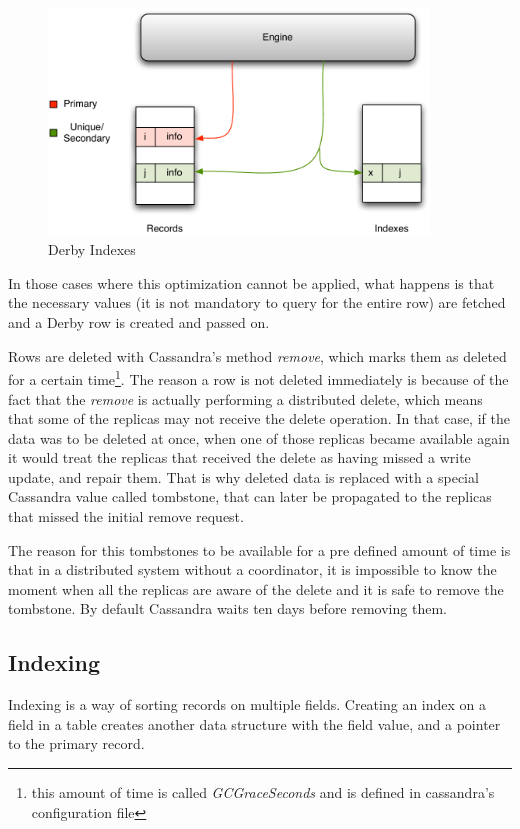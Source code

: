 \begin{figure}[!h]
  \centering    
  \includegraphics[width=0.9\textwidth]{images/derbyindexes}
  \caption{Derby Indexes}
  \label{fig:derbyindexes}
\end{figure}

In those cases where this optimization cannot be applied, what happens is that the necessary values (it is not mandatory to query for the entire row) are fetched and a Derby row is created and passed on.  

Rows are deleted with Cassandra's method \emph{remove}, which marks them as deleted for a certain time\footnote{this amount of time is called \emph{GCGraceSeconds} and is defined in cassandra's configuration file}. The reason a row is not deleted immediately is because of the fact that the \emph{remove} is actually performing a distributed delete, which means that some of the replicas may not receive the delete operation. In that case, if the data was to be deleted at once, when one of those replicas became available again it would treat the replicas that received the delete as having missed a write update, and repair them. That is why deleted data is replaced with a special Cassandra value called tombstone, that can later be propagated to the replicas that missed the initial remove request.

The reason for this tombstones to be available for a pre defined amount of time is that in a distributed system without a coordinator, it is impossible to know the moment when all the replicas are aware of the delete and it is safe to remove the tombstone. By default Cassandra waits ten days before removing them.


\subsection{Indexing}
\label{sec:derby_index}
Indexing is a way of sorting records on multiple fields. Creating an index on a field in a table creates another data structure with the field value, and a pointer to the primary record. 

